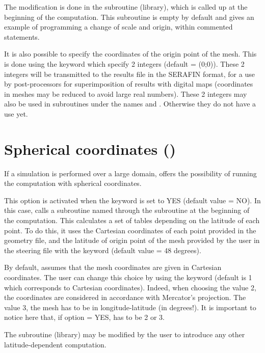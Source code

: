 The modification is done in the  subroutine
(\bief library), which is called up at the beginning of the computation.
This subroutine is empty by default and gives an example of programming
a change of scale and origin, within commented statements.

It is also possible to specify the coordinates of the origin point of the mesh.
This is done using the keyword 
which specify 2 integers (default = (0;0)).
These 2 integers will be transmitted to the results file in the SERAFIN format,
for a use by post-processors for superimposition of results with digital maps
(coordinates in meshes may be reduced to avoid large real numbers).
These 2 integers may also be used in subroutines under the names
 and .
Otherwise they do not have a use yet.


\section{Spherical coordinates ()}
\label{sec:spher:coord:LATI}
If a simulation is performed over a large domain,  offers
the possibility of running the computation with spherical coordinates.

This option is activated when the keyword 
is set to YES (default value = NO).
In this case,  calls a subroutine named 
through the subroutine  at the beginning of the computation.
This calculates a set of tables depending on the latitude of each point.
To do this, it uses the Cartesian coordinates of each point provided
in the geometry file, and the latitude of origin point of the mesh
provided by the user in the steering file with the keyword
 (default value = 48 degrees).

By default,  assumes that the mesh coordinates are given
in Cartesian coordinates.
The user can change this choice by using the keyword
 (default is 1 which corresponds to Cartesian
coordinates).
Indeed, when choosing the value 2, the coordinates are considered
in accordance with Mercator's projection.
The value 3, the mesh has to be in longitude-latitude (in degrees!).
It is important to notice here that, if option 
= YES,  has to be 2 or 3.

The  subroutine (\bief library) may be modified by the user
to introduce any other latitude-dependent computation.


